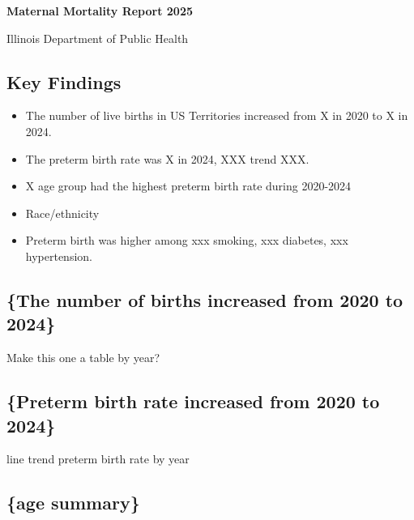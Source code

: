 \begin{titlepage}
    \centering
    {\Huge\bfseries\color{primaryblue} Maternal Mortality Report 2025\par}
    \vspace{1em}
    {\Large\color{accentgold} Illinois Department of Public Health\par}
    \vfill
\end{titlepage}

\subsection{Key Findings}\label{key-findings}

\begin{itemize}
\tightlist
\item
  The number of live births in US Territories increased from X in 2020
  to X in 2024.\\
\item
  The preterm birth rate was X in 2024, XXX trend XXX.\\
\item
  X age group had the highest preterm birth rate during 2020-2024\\
\item
  Race/ethnicity\\
\item
  Preterm birth was higher among xxx smoking, xxx diabetes, xxx
  hypertension.
\end{itemize}

\subsection{\{The number of births increased from 2020 to
2024\}}\label{the-number-of-births-increased-from-2020-to-2024}

Make this one a table by year?

\subsection{\{Preterm birth rate increased from 2020 to
2024\}}\label{preterm-birth-rate-increased-from-2020-to-2024}

line trend preterm birth rate by year

\subsection{\{age summary\}}\label{age-summary}

